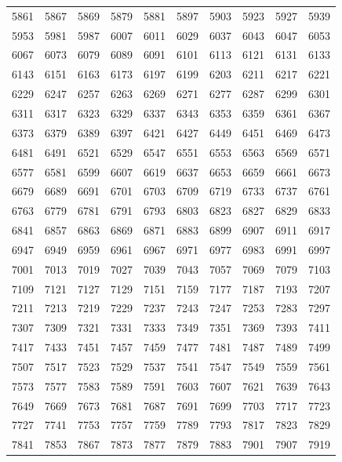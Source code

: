 \documentclass{article}
\begin{document}

\begin{tabular}{llllllllll}
5861 & 5867 & 5869 & 5879 & 5881 & 5897 & 5903 & 5923 & 5927 & 5939 \\
5953 & 5981 & 5987 & 6007 & 6011 & 6029 & 6037 & 6043 & 6047 & 6053 \\
6067 & 6073 & 6079 & 6089 & 6091 & 6101 & 6113 & 6121 & 6131 & 6133 \\
6143 & 6151 & 6163 & 6173 & 6197 & 6199 & 6203 & 6211 & 6217 & 6221 \\
6229 & 6247 & 6257 & 6263 & 6269 & 6271 & 6277 & 6287 & 6299 & 6301 \\
6311 & 6317 & 6323 & 6329 & 6337 & 6343 & 6353 & 6359 & 6361 & 6367 \\
6373 & 6379 & 6389 & 6397 & 6421 & 6427 & 6449 & 6451 & 6469 & 6473 \\
6481 & 6491 & 6521 & 6529 & 6547 & 6551 & 6553 & 6563 & 6569 & 6571 \\
6577 & 6581 & 6599 & 6607 & 6619 & 6637 & 6653 & 6659 & 6661 & 6673 \\
6679 & 6689 & 6691 & 6701 & 6703 & 6709 & 6719 & 6733 & 6737 & 6761 \\
6763 & 6779 & 6781 & 6791 & 6793 & 6803 & 6823 & 6827 & 6829 & 6833 \\
6841 & 6857 & 6863 & 6869 & 6871 & 6883 & 6899 & 6907 & 6911 & 6917 \\
6947 & 6949 & 6959 & 6961 & 6967 & 6971 & 6977 & 6983 & 6991 & 6997 \\
7001 & 7013 & 7019 & 7027 & 7039 & 7043 & 7057 & 7069 & 7079 & 7103 \\
7109 & 7121 & 7127 & 7129 & 7151 & 7159 & 7177 & 7187 & 7193 & 7207 \\
7211 & 7213 & 7219 & 7229 & 7237 & 7243 & 7247 & 7253 & 7283 & 7297 \\
7307 & 7309 & 7321 & 7331 & 7333 & 7349 & 7351 & 7369 & 7393 & 7411 \\
7417 & 7433 & 7451 & 7457 & 7459 & 7477 & 7481 & 7487 & 7489 & 7499 \\
7507 & 7517 & 7523 & 7529 & 7537 & 7541 & 7547 & 7549 & 7559 & 7561 \\
7573 & 7577 & 7583 & 7589 & 7591 & 7603 & 7607 & 7621 & 7639 & 7643 \\
7649 & 7669 & 7673 & 7681 & 7687 & 7691 & 7699 & 7703 & 7717 & 7723 \\
7727 & 7741 & 7753 & 7757 & 7759 & 7789 & 7793 & 7817 & 7823 & 7829 \\
7841 & 7853 & 7867 & 7873 & 7877 & 7879 & 7883 & 7901 & 7907 & 7919
\end{tabular}
\end{document}
